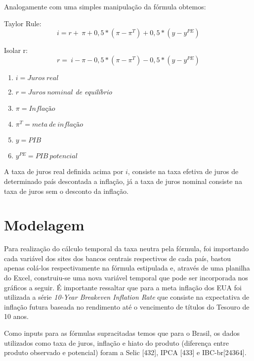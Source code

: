  Analogamente com uma simples manipula\c{c}\~{a}o da f\'{o}rmula obtemos: 



Taylor Rule: 
\[i=r+~\pi +0,5*\left(\pi -{\pi }^T\right)+0,5*\left(y-y^{PE}\right)\] 

Isolar r: 
\[r=~i-\pi -0,5*\left(\pi -{\pi }^T\right)-0,5*\left(y-y^{PE}\right)\] 


\begin{enumerate}
\item  $i=Juros~real$

\item  $r=Juros~nominal$\textit{ de equil\'{i}brio }

\item  $\pi =Infla\textrm{\c{c}}\textrm{\~{a}}o$

\item  ${\pi }^T=meta~de~infla\textrm{\c{c}}\textrm{\~{a}}o~$

\item  $y=PIB$

\item  $y^{PE}=PIB~potencial$
\end{enumerate}

\noindent 

A taxa de juros real definida acima por $i$, consiste na taxa efetiva de juros de determinado pa\'{i}s descontada a infla\c{c}\~{a}o, j\'{a} a taxa de juros nominal consiste na taxa de juros sem o desconto da infla\c{c}\~{a}o. 

\noindent 

\section{Modelagem}

Para realiza\c{c}\~{a}o do c\'{a}lculo temporal da taxa neutra pela f\'{o}rmula, foi importando cada vari\'{a}vel dos sites dos bancos centrais respectivos de cada pa\'{i}s, bastou apenas col\'{a}-los respectivamente na f\'{o}rmula estipulada e, atrav\'{e}s de uma planilha do Excel, construiu-se uma nova vari\'{a}vel temporal que pode ser incorporada nos gr\'{a}ficos a seguir. \'{E} importante ressaltar que para a meta infla\c{c}\~{a}o dos EUA foi utilizada a s\'{e}rie \textit{10-Year Breakeven Inflation Rate }que consiste na expectativa de infla\c{c}\~{a}o futura baseada no rendimento at\'{e} o vencimento de t\'{i}tulos do Tesouro de 10 anos. \textbf{}

 Como inputs para as f\'{o}rmulas supracitadas temos que para o Brasil, os dados utilizados como taxa de juros, infla\c{c}\~{a}o e hiato do produto (diferen\c{c}a entre produto observado e potencial) foram a Selic [432], IPCA [433] e IBC-br[24364]. 

